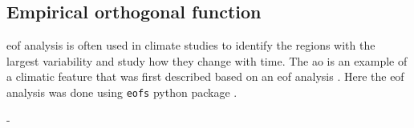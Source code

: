 \subsection{Empirical orthogonal function}

\acrfull{eof} analysis is often used in climate studies to identify the regions with the largest variability and study how they change with time. 
The \acrshort{ao} is an example of a climatic feature that was first described based on an \acrshort{eof} analysis \parencite{thompson1998arctic}. Here the \acrshort{eof} analysis was done using \verb|eofs| python package \parencite{dawson2016eofs}.  

-